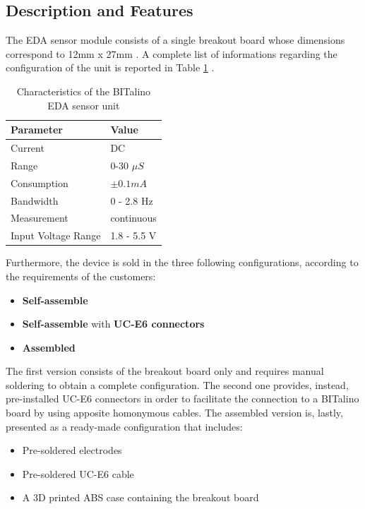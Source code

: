 \subsection{Description and Features}\label{subsec:bitalino-features}

The EDA sensor module consists of a single breakout board whose dimensions correspond to 12mm x 27mm \cite{bitalino-general}. A complete list of informations regarding the configuration of the unit is reported in Table \ref{toc:bitalino-features} .

\begin{table}[H]
\centering
\begin{tabular}{ll}
    \hline
    Parameter               & Value \\
    \hline
    Current                 & DC \\
    Range                   & 0-30 $\mu S$ \\
    Consumption             & $\pm 0.1 mA$ \\
    Bandwidth               & 0 - 2.8 Hz \\
    Measurement             & continuous \\
    Input Voltage Range     & 1.8 - 5.5 V \\
    \hline
\end{tabular}
\caption{Characteristics of the BITalino EDA sensor unit}
\label{toc:bitalino-features}
\end{table}

Furthermore, the device is sold in the three following configurations, according to the requirements of the customers: 
\begin{itemize}
    \item \textbf{Self-assemble}
    \item \textbf{Self-assemble} with \textbf{UC-E6 connectors}
    \item \textbf{Assembled}
\end{itemize}

\vspace{3mm}

The first version consists of the breakout board only and requires manual soldering to obtain a complete configuration. The second one provides, instead, pre-installed UC-E6 connectors in order to facilitate the connection to a BITalino board by using apposite homonymous cables. The assembled version is, lastly, presented as a ready-made configuration that includes: 

\begin{itemize}
    \item Pre-soldered electrodes
    \item Pre-soldered UC-E6 cable
    \item A 3D printed ABS case containing the breakout board
\end{itemize}

